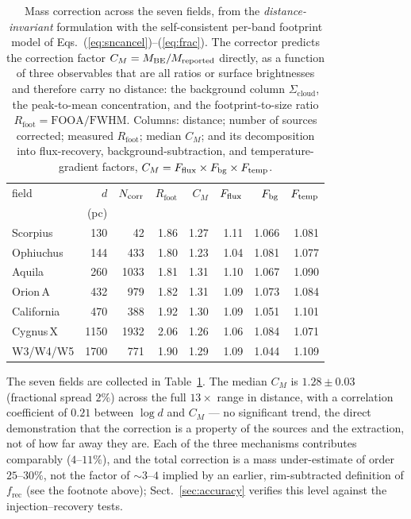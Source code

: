 \documentclass[11pt,a4paper]{article}
\newcommand{\Scloud}{\Sigma_{\mathrm{cloud}}}
\begin{document}
\begin{table}
\caption{Mass correction across the seven fields, from the
\emph{distance-invariant} formulation with the self-consistent per-band
footprint model of Eqs.~(\ref{eq:sncancel})--(\ref{eq:frac}). The corrector
predicts the correction factor $C_M = M_{\rm BE}/M_{\rm reported}$ directly,
as a function of three observables that are all ratios or surface
brightnesses and therefore carry no distance: the background column
$\Scloud$, the peak-to-mean concentration, and the footprint-to-size ratio
$R_{\mathrm{foot}}=\mathrm{FOOA}/\mathrm{FWHM}$. Columns: distance; number of
sources corrected; measured $R_{\mathrm{foot}}$; median $C_M$; and its
decomposition into flux-recovery, background-subtraction, and
temperature-gradient factors, $C_M=F_{\rm flux}\times F_{\rm bg}\times
F_{\rm temp}$.}
\label{tab:sevencloud}
\centering
\begin{tabular}{lrrrrrrr}
\hline
field & $d$ & $N_{\rm corr}$ & $R_{\mathrm{foot}}$ &
$C_M$ & $F_{\rm flux}$ & $F_{\rm bg}$ & $F_{\rm temp}$ \\
 & (pc) & & & & & & \\
\hline
Scorpius   &  130 &   42 & 1.86 & 1.27 & 1.11 & 1.066 & 1.081 \\
Ophiuchus  &  144 &  433 & 1.80 & 1.23 & 1.04 & 1.081 & 1.077 \\
Aquila     &  260 & 1033 & 1.81 & 1.31 & 1.10 & 1.067 & 1.090 \\
Orion\,A   &  432 &  979 & 1.82 & 1.31 & 1.09 & 1.073 & 1.084 \\
California &  470 &  388 & 1.92 & 1.30 & 1.09 & 1.051 & 1.101 \\
Cygnus\,X  & 1150 & 1932 & 2.06 & 1.26 & 1.06 & 1.084 & 1.071 \\
W3/W4/W5   & 1700 &  771 & 1.90 & 1.29 & 1.09 & 1.044 & 1.109 \\
\hline
\end{tabular}
\end{table}

The seven fields are collected in Table~\ref{tab:sevencloud}. The median $C_M$
is $1.28\pm0.03$ (fractional spread $2\%$) across the full $13\times$ range in
distance, with a correlation coefficient of $0.21$ between $\log d$ and
$C_M$ --- no significant trend, the direct demonstration that the correction
is a property of the sources and the extraction, not of how far away they
are. Each of the three mechanisms contributes comparably ($4$--$11\%$), and
the total correction is a mass under-estimate of order $25$--$30\%$, not the
factor of $\sim\!3$--$4$ implied by an earlier, rim-subtracted definition of
$f_{\mathrm{rec}}$ (see the footnote above); Sect.~\ref{sec:accuracy}
verifies this level against the injection--recovery tests.
\end{document}

